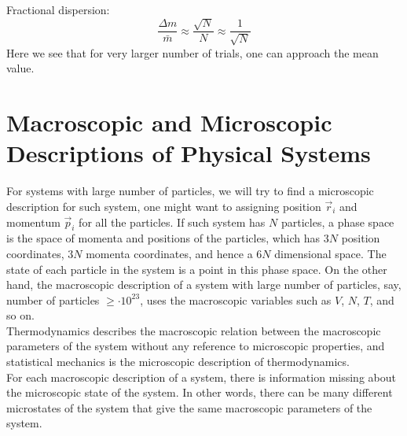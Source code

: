 \documentclass[11pt,oneside]{book}
\theoremstyle{break}
\theoremstyle{break}
\newcommand{\ee}[1]{\cdot 10^{#1}}
\begin{document}
Fractional dispersion:
$$\frac{\Delta m}{\bar{m}} \approx \frac{\sqrt{N}}{N} \approx \frac{1}{\sqrt{N}} $$
Here we see that for very larger number of trials, one can approach the mean value. 
\newpage

\section[Macroscopic and Microscopic Descriptions of Physical Systems]{\color{red} Macroscopic and Microscopic Descriptions of Physical Systems\color{black}}

For systems with large number of particles, we will try to find a microscopic description for such system, one might want to assigning position $\vec{r}_i$ and momentum $\vec{p}_i$ for all the particles. If such system has $N$ particles, a phase space is the space of momenta and positions of the particles, which has $3N$ position coordinates, $3N$ momenta coordinates, and hence a $6N$ dimensional space. The state of each particle in the system is a point in this phase space. On the other hand, the macroscopic description of a system with large number of particles, say, number of particles $\geq \ee{23}$, uses the macroscopic variables such as $V$, $N$, $T$, and so on.\\

Thermodynamics describes the macroscopic relation between the macroscopic parameters of the system without any reference to microscopic properties, and statistical mechanics is the microscopic description of thermodynamics.\\

For each macroscopic description of a system, there is information missing about the microscopic state of the system. In other words, there can be many different microstates of the system that give the same macroscopic parameters of the system.\\
\end{document}
